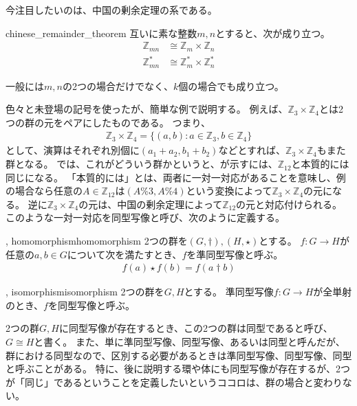
今注目したいのは、中国の剰余定理の系である。

\begin{Coro}{}{chinese_remainder_theorem}
互いに素な整数$m,n$とすると、次が成り立つ。
\begin{align*}
\mathbb{Z}_{mn} &\cong \mathbb{Z}_m \times \mathbb{Z}_n\\
\mathbb{Z}_{mn}^* &\cong \mathbb{Z}_m^* \times \mathbb{Z}_n^*
\end{align*}
\end{Coro}

一般には$m,n$の2つの場合だけでなく、$k$個の場合でも成り立つ。

色々と未登場の記号を使ったが、簡単な例で説明する。
例えば、$\mathbb{Z}_3\times\mathbb{Z}_4$とは2つの群の元をペアにしたものである。
つまり、
\begin{align*}
\mathbb{Z}_3\times\mathbb{Z}_4 = \{(a,b) : a \in \mathbb{Z}_3, b \in \mathbb{Z}_4\}
\end{align*}
として、演算はそれぞれ別個に$(a_1+a_2,b_1+b_2)$などとすれば、$\mathbb{Z}_3\times\mathbb{Z}_4$もまた群となる。
では、これがどういう群かというと、が示すには、$\mathbb{Z}_{12}$と本質的には同じになる。
「本質的には」とは、両者に一対一対応があることを意味し、例の場合なら任意の$A\in\mathbb{Z}_{12}$は$(A \% 3, A \% 4)$という変換によって$\mathbb{Z}_3\times\mathbb{Z}_4$の元になる。
逆に$\mathbb{Z}_3\times\mathbb{Z}_4$の元は、中国の剰余定理によって$\mathbb{Z}_{12}$の元と対応付けられる。
このような一対一対応を同型写像と呼び、次のように定義する。

\begin{Defi}{, homomorphism}{homomorphism}
2つの群を$(G, \dagger),(H, \star)$とする。
$f:G\to H$が任意の$a,b\in G$について次を満たすとき、$f$を準同型写像と呼ぶ。
\begin{align*}
f(a) \star f(b) = f(a \dagger b)
\end{align*}
\end{Defi}

\begin{Defi}{, isomorphism}{isomorphism}
2つの群を$G,H$とする。
準同型写像$f:G\to H$が全単射のとき、$f$を同型写像と呼ぶ。
\end{Defi}

2つの群$G,H$に同型写像が存在するとき、この2つの群は同型であると呼び、$G\cong H$と書く。
また、単に準同型写像、同型写像、あるいは同型と呼んだが、群における同型なので、区別する必要があるときは準同型写像、同型写像、同型と呼ぶことがある。
特に、後に説明する環や体にも同型写像が存在するが、2つが「同じ」であるということを定義したいというココロは、群の場合と変わりない。

